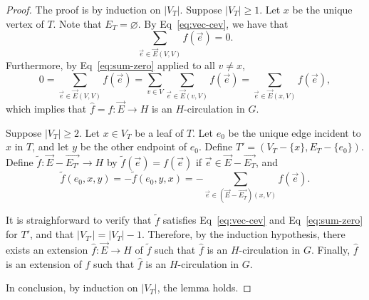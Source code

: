 \begin{proof}
    The proof is by induction on \(|V_T|\).
    Suppose \(|V_T| \geq 1\).
    Let \(x\) be the unique vertex of \(T\).
    Note that \(E_T = \varnothing\).
    By Eq~\eqref{eq:vec-cev}, we have that
    \begin{equation}
        \sum_{\vec{e} \in \vec{E}(V, V)} f(\vec{e}) = 0.
    \end{equation}
    Furthermore, by Eq~\eqref{eq:sum-zero} applied to all \(v \neq x\),
    \begin{equation}
        0
        =
        \sum_{\vec{e} \in \vec{E}(V, V)} f(\vec{e})
        =
        \sum_{v \in V} \sum_{\vec{e} \in \vec{E}(v, V)} f(\vec{e})
        =
        \sum_{\vec{e} \in \vec{E}(x, V)} f(\vec{e}),
    \end{equation}
    which implies that \(\hat{f} = f \colon \vec{E} \to H\) is an \(H\)-circulation in \(G\).

    Suppose \(|V_T| \geq 2\).
    Let \(x \in V_T\) be a leaf of \(T\).
    Let \(e_0\) be the unique edge incident to \(x\) in \(T\),
    and let \(y\) be the other endpoint of \(e_0\).
    Define \(T' = (V_T - \{x\}, E_T - \{e_0\})\).
    Define \(\tilde{f} \colon \vec{E} - \vec{E_{T'}} \to H\) by
    \(
    \tilde{f}(\vec{e}) = f(\vec{e})
    \)
    if \(\vec{e} \in \vec{E} - \vec{E_{T}}\),
    and
    \begin{equation}
        \tilde{f}(e_0, x, y)
        = -\tilde{f}(e_0, y, x)
        = -\sum_{\vec{e} \in (\vec{E} - \vec{E_T})(x, V)} f(\vec{e}).
    \end{equation}

    It is straighforward to verify that \(\tilde{f}\) satisfies Eq~\eqref{eq:vec-cev} and Eq~\eqref{eq:sum-zero} for \(T'\), and that \(|V_{T'}| = |V_T| - 1\).
    Therefore, by the induction hypothesis, there exists an extension \(\hat{f} \colon \vec{E} \to H\) of \(\tilde{f}\) such that \(\hat{f}\) is an \(H\)-circulation in \(G\).
    Finally, \(\hat{f}\) is an extension of \(f\) such that \(\hat{f}\) is an \(H\)-circulation in \(G\).

    In conclusion, by induction on \(|V_T|\), the lemma holds.
\end{proof}

